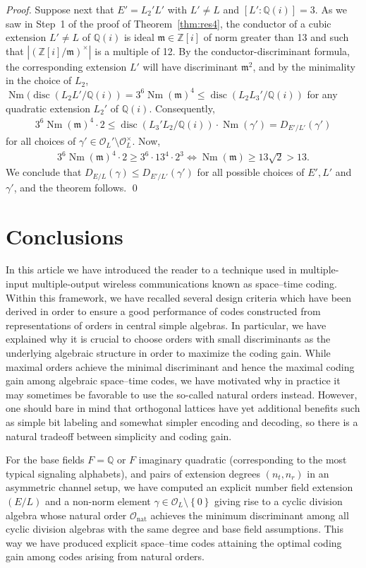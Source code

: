 \documentclass[smallextended]{svjour3}
\newcommand{\Q}{\mathbb{Q}}
\newcommand{\Z}{\mathbb{Z}}
\newcommand{\mcl}{\Or_{L}}
\newcommand{\Or}{\mathcal{O}}
\DeclareMathOperator{\Nm}{Nm}
\DeclareMathOperator{\nat}{nat}
\DeclareMathOperator{\disc}{disc}
\begin{document}
\begin{proof}
Suppose next that $E' = L_2'L'$ with $L'\ne L$ and $[L':\Q(i)] = 3$. As we saw in Step~1 of the proof of Theorem~\ref{thm:res4}, the conductor of a cubic extension $L'\ne L$ of $\Q(i)$ is ideal $\mathfrak m \in \Z[i]$  of norm greater than 13 and such that $|(\Z[i]/\mathfrak m)^\times|$ is a multiple of 12. By the conductor-discriminant formula, the corresponding extension $L'$ will have discriminant $\mathfrak m^2$, and by the minimality in the choice of $L_2$, $\Nm(\disc (L_2L'/\Q(i))=3^6 \Nm(\mathfrak m)^4\le \disc(L_2L_3' /\Q(i))$ for any quadratic extension $L_2'$ of $\Q(i)$. Consequently, 
\begin{align*}
	3^6 \Nm(\mathfrak m)^4\cdot 2\le \disc(L_3'L_2 /\Q(i))\cdot \Nm(\gamma') = D_{E'/L'}(\gamma')
\end{align*}  
for all choices of $\gamma' \in \Or_L'\setminus \Or_L^{\times}$.
Now, 
\begin{align*}
	3^6 \Nm(\mathfrak m)^4\cdot 2\ge 3^6\cdot 13^4\cdot 2^3   \Leftrightarrow  \Nm (\mathfrak m) \ge 13\sqrt 2> 13.
\end{align*}
We conclude that $D_{E/L}(\gamma) \le D_{E'/L'}(\gamma')$ for all possible choices of $E', L'$ and $\gamma'$, and the theorem follows.
 \qed
\end{proof}


\section{Conclusions}

In this article we have introduced the reader to a technique used in multiple-input multiple-output wireless communications known as space--time coding. Within this framework, we have recalled several design criteria which have been derived in order to ensure a good performance of codes constructed from representations of orders in central simple algebras. In particular, we have explained why it is crucial to choose orders with small discriminants as the underlying algebraic structure in order to maximize the coding gain. While maximal orders achieve the minimal discriminant and hence the maximal coding gain among algebraic space--time codes, we have motivated why in practice it may sometimes be favorable to use the so-called natural orders instead. However, one should bare in mind that orthogonal lattices have yet additional benefits such as simple bit labeling and somewhat simpler encoding and decoding, so there is a natural tradeoff between simplicity and coding gain. 

For the base fields $F=\Q$ or $F$ imaginary quadratic (corresponding to the most typical signaling alphabets), and pairs of extension degrees $(n_t,n_r)$ in an asymmetric channel setup, we have computed an explicit number field extension $(E/L)$ and a non-norm element $\gamma \in \mcl\setminus\left\{0\right\}$ giving rise to a cyclic division algebra whose  natural order $\Or_{\nat}$  achieves the minimum discriminant among all cyclic division algebras with the same degree and base field assumptions. This way we have produced explicit space--time codes attaining the optimal coding gain among codes arising from natural orders. 
\end{document}
